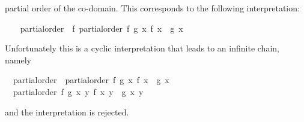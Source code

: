 \begin{isabellebody}
\begin{isamarkuptext}
  partial order of the co-domain.  This corresponds to the following
  interpretation:%
\end{isamarkuptext}%
\isamarkuptrue%
%
\isadelimvisible
\ \ %
\endisadelimvisible
%
\isatagvisible
{}\isamarkupfalse%
\ partial{\isacharunderscore}order\ {\isasymsubseteq}\ f{\isacharcolon}\ partial{\isacharunderscore}order\ {\isachardoublequoteopen}{\isasymlambda}f\ g{\isachardot}\ {\isasymforall}x{\isachardot}\ f\ x\ {\isasymsqsubseteq}\ g\ x{\isachardoublequoteclose}\isanewline
\ \ \ \ \isamarkupfalse%
%
\endisatagvisible
{\isafoldvisible}%
%
\isadelimvisible
%
\endisadelimvisible
%
\begin{isamarkuptext}%
Unfortunately this is a cyclic interpretation that leads to an
  infinite chain, namely
  \begin{isabelle}%
\ \ partial{\isacharunderscore}order\ {\isasymsubseteq}\ partial{\isacharunderscore}order\ {\isacharparenleft}{\isasymlambda}f\ g{\isachardot}\ {\isasymforall}x{\isachardot}\ f\ x\ {\isasymsqsubseteq}\ g\ x{\isacharparenright}\ {\isasymsubseteq}\isanewline
\isaindent{\ \ }\ \ partial{\isacharunderscore}order\ {\isacharparenleft}{\isasymlambda}f\ g{\isachardot}\ {\isasymforall}x\ y{\isachardot}\ f\ x\ y\ {\isasymsqsubseteq}\ g\ x\ y{\isacharparenright}\ {\isasymsubseteq}\ \ {\isasymdots}%
\end{isabelle}
  and the interpretation is rejected.


\end{isamarkuptext}
\end{isabellebody}
